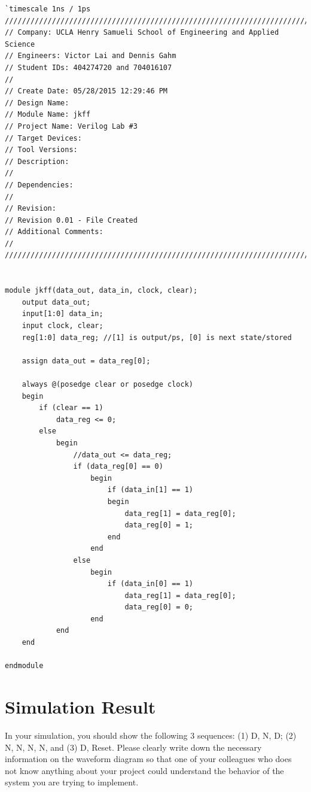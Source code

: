 \documentclass{article}
\begin{document}
\begin{verbatim}
`timescale 1ns / 1ps
/////////////////////////////////////////////////////////////////////////////
// Company: UCLA Henry Samueli School of Engineering and Applied Science
// Engineers: Victor Lai and Dennis Gahm
// Student IDs: 404274720 and 704016107 
// 
// Create Date: 05/28/2015 12:29:46 PM
// Design Name: 
// Module Name: jkff
// Project Name: Verilog Lab #3
// Target Devices: 
// Tool Versions: 
// Description: 
// 
// Dependencies: 
// 
// Revision:
// Revision 0.01 - File Created
// Additional Comments:
// 
/////////////////////////////////////////////////////////////////////////////


module jkff(data_out, data_in, clock, clear);
    output data_out;
    input[1:0] data_in;
    input clock, clear;
    reg[1:0] data_reg; //[1] is output/ps, [0] is next state/stored
    
    assign data_out = data_reg[0];
    
    always @(posedge clear or posedge clock)
    begin
        if (clear == 1)
            data_reg <= 0;
        else
            begin
                //data_out <= data_reg;
                if (data_reg[0] == 0)
                    begin
                        if (data_in[1] == 1)
                        begin
                            data_reg[1] = data_reg[0];
                            data_reg[0] = 1;
                        end
                    end
                else
                    begin
                        if (data_in[0] == 1)
                            data_reg[1] = data_reg[0];
                            data_reg[0] = 0;
                    end
            end 
    end

endmodule
\end{verbatim}


\section{Simulation Result}
In your simulation, you should show the following 3 sequences: (1) D, N, D;
(2) N, N, N, N, and (3) D, Reset. Please clearly write down the necessary 
information on the waveform diagram so that one of your colleagues who does 
not know anything about your project could understand the behavior of the 
system you are trying to implement.\\
\end{document}
